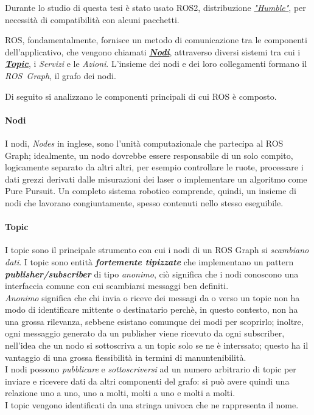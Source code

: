 Durante lo studio di questa tesi è stato usato ROS2, distribuzione
\href{https://docs.ros.org/en/humble/}{\textit{"Humble"}},
per necessità di compatibilità con alcuni pacchetti.

\medskip
ROS, fondamentalmente, fornisce un metodo di comunicazione tra le componenti dell'applicativo, che
vengono chiamati \hyperref[ros:nodes]{\textbf{\textit{Nodi}}}, attraverso diversi sistemi tra cui i
\hyperref[ros:topics]{\textbf{\textit{Topic}}}, i \textit{Servizi} e le \textit{Azioni}.
L'insieme dei nodi e dei loro collegamenti formano il \textit{ROS~Graph}, il grafo dei nodi.

\medskip
\noindent Di seguito si analizzano le componenti principali di cui ROS è composto.
\paragraph{Nodi}
\label{ros:nodes}
I nodi, \textit{Nodes} in inglese, sono l'unità computazionale che partecipa al ROS Graph;
idealmente, un nodo dovrebbe essere responsabile di un solo compito, logicamente separato
da altri altri, per esempio controllare le ruote, processare i dati grezzi derivati dalle misurazioni
dei laser o implementare un algoritmo come Pure Pursuit.
Un completo sistema robotico comprende, quindi, un insieme di nodi che lavorano congiuntamente, spesso
contenuti nello stesso eseguibile.

\paragraph{Topic}
\label{ros:topics}
I topic sono il principale strumento con cui i nodi di un ROS Graph si \textit{scambiano dati}.
I topic sono entità \textbf{\textit{fortemente tipizzate}} che implementano
un pattern \textbf{\textit{publisher/subscriber}} di tipo \textit{anonimo}, ciò significa
che i nodi conoscono una interfaccia comune con cui scambiarsi messaggi ben definiti.\\
\textit{Anonimo} significa che chi invia o riceve dei messagi da o verso un topic
non ha modo di identificare mittente o destinatario perchè, in questo contesto, non ha una grossa rilevanza,
sebbene esistano comunque dei modi per scoprirlo; inoltre, ogni messaggio generato da un publisher
viene ricevuto da ogni subscriber, nell'idea che un nodo si sottoscriva a un topic solo se ne è
interssato; questo ha il vantaggio di una grossa flessibilità in termini di manuntenibilità.\\
I nodi possono \textit{pubblicare} e \textit{sottoscriversi} ad un numero arbitrario di topic
per inviare e ricevere dati da altri componenti del grafo: si può avere quindi una relazione uno a
uno, uno a molti, molti a uno e molti a molti.\\
I topic vengono identificati da una stringa univoca che ne rappresenta il nome.

